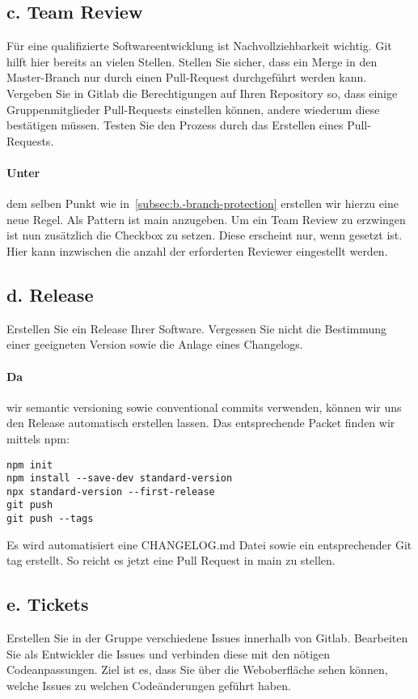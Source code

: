 \subsection{c. Team Review}\label{subsec:c.-team-review}
Für eine qualifizierte Softwareentwicklung ist Nachvollziehbarkeit wichtig.
Git hilft hier bereits an vielen Stellen.
Stellen Sie sicher, dass ein Merge in den Master-Branch nur durch einen Pull-Request durchgeführt werden kann.
Vergeben Sie in Gitlab die Berechtigungen auf Ihren Repository so, dass einige Gruppenmitglieder Pull-Requests einstellen können, andere wiederum diese bestätigen müssen.
Testen Sie den Prozess durch das Erstellen eines Pull-Requests.

\paragraph{Unter} dem selben Punkt wie in~\ref{subsec:b.-branch-protection} erstellen wir hierzu eine neue Regel.
Als Pattern ist main anzugeben.
Um ein Team Review zu erzwingen ist nun zusätzlich die Checkbox  zu setzen.
Diese erscheint nur, wenn  gesetzt ist.
Hier kann inzwischen die anzahl der erforderten Reviewer eingestellt werden.

\subsection{d. Release}\label{subsec:d.-release}
Erstellen Sie ein Release Ihrer Software.
Vergessen Sie nicht die Bestimmung einer geeigneten Version sowie die Anlage eines Changelogs.

\paragraph{Da} wir semantic versioning sowie conventional commits verwenden, können wir uns den Release automatisch erstellen lassen.
Das entsprechende Packet finden wir mittels npm:
\begin{lstlisting}[label={lst:create-release}, caption={Erstellen eines Releases}]
npm init
npm install --save-dev standard-version
npx standard-version --first-release
git push
git push --tags
\end{lstlisting}
Es wird automatisiert eine CHANGELOG.md Datei sowie ein entsprechender Git tag erstellt.
So reicht es jetzt eine Pull Request in main zu stellen.

\subsection{e. Tickets}\label{subsec:e.-tickets}
Erstellen Sie in der Gruppe verschiedene Issues innerhalb von Gitlab.
Bearbeiten Sie als Entwickler die Issues und verbinden diese mit den nötigen Codeanpassungen.
Ziel ist es, dass Sie über die Weboberfläche sehen können, welche Issues zu welchen Codeänderungen geführt haben.

